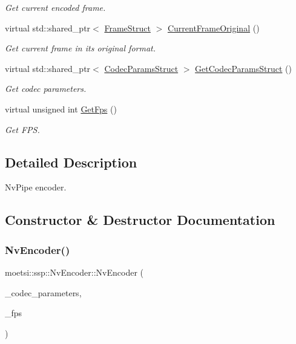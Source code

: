 \begin{DoxyCompactItemize}
\begin{DoxyCompactList}\small\item\em Get current encoded frame. \end{DoxyCompactList}\item 
virtual std\+::shared\+\_\+ptr$<$ \hyperlink{structmoetsi_1_1ssp_1_1FrameStruct}{Frame\+Struct} $>$ \hyperlink{classmoetsi_1_1ssp_1_1NvEncoder_a56baf331eae448da89ee54b69fec170c}{Current\+Frame\+Original} ()
\begin{DoxyCompactList}\small\item\em Get current frame in its original format. \end{DoxyCompactList}\item 
virtual std\+::shared\+\_\+ptr$<$ \hyperlink{structmoetsi_1_1ssp_1_1CodecParamsStruct}{Codec\+Params\+Struct} $>$ \hyperlink{classmoetsi_1_1ssp_1_1NvEncoder_aa6229a43b12d2f27e27f518fc2229b61}{Get\+Codec\+Params\+Struct} ()
\begin{DoxyCompactList}\small\item\em Get codec parameters. \end{DoxyCompactList}\item 
virtual unsigned int \hyperlink{classmoetsi_1_1ssp_1_1NvEncoder_ab94b826f2aef05afad376132743001d9}{Get\+Fps} ()
\begin{DoxyCompactList}\small\item\em Get F\+PS. \end{DoxyCompactList}\end{DoxyCompactItemize}


\subsection{Detailed Description}
Nv\+Pipe encoder. 

\subsection{Constructor \& Destructor Documentation}
\mbox{\label{classmoetsi_1_1ssp_1_1NvEncoder_aab4a3ce1729dba51183b77adcc78aa5e}} 
\subsubsection{\texorpdfstring{Nv\+Encoder()}{NvEncoder()}}
{\footnotesize\ttfamily moetsi\+::ssp\+::\+Nv\+Encoder\+::\+Nv\+Encoder (\begin{DoxyParamCaption}\item[{Y\+A\+M\+L\+::\+Node}]{\+\_\+codec\+\_\+parameters,  }\item[{unsigned int}]{\+\_\+fps }\end{DoxyParamCaption})}



